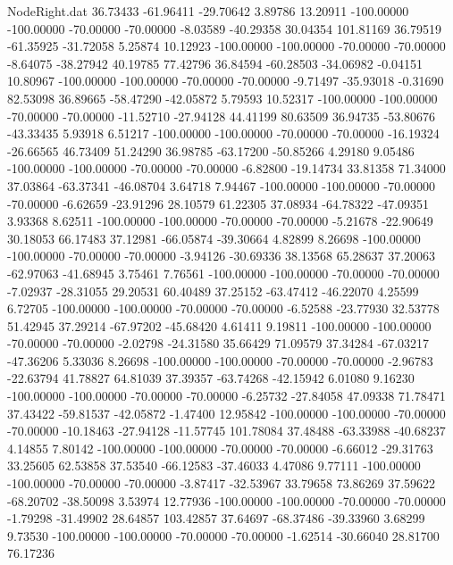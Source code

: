 \begin{filecontents}{NodeRight.dat}
  36.73433  -61.96411  -29.70642     3.89786   13.20911 -100.00000 -100.00000  -70.00000  -70.00000   -8.03589  -40.29358   30.04354  101.81169
  36.79519  -61.35925  -31.72058     5.25874   10.12923 -100.00000 -100.00000  -70.00000  -70.00000   -8.64075  -38.27942   40.19785   77.42796
  36.84594  -60.28503  -34.06982    -0.04151   10.80967 -100.00000 -100.00000  -70.00000  -70.00000   -9.71497  -35.93018   -0.31690   82.53098
  36.89665  -58.47290  -42.05872     5.79593   10.52317 -100.00000 -100.00000  -70.00000  -70.00000  -11.52710  -27.94128   44.41199   80.63509
  36.94735  -53.80676  -43.33435     5.93918    6.51217 -100.00000 -100.00000  -70.00000  -70.00000  -16.19324  -26.66565   46.73409   51.24290
  36.98785  -63.17200  -50.85266     4.29180    9.05486 -100.00000 -100.00000  -70.00000  -70.00000   -6.82800  -19.14734   33.81358   71.34000
  37.03864  -63.37341  -46.08704     3.64718    7.94467 -100.00000 -100.00000  -70.00000  -70.00000   -6.62659  -23.91296   28.10579   61.22305
  37.08934  -64.78322  -47.09351     3.93368    8.62511 -100.00000 -100.00000  -70.00000  -70.00000   -5.21678  -22.90649   30.18053   66.17483
  37.12981  -66.05874  -39.30664     4.82899    8.26698 -100.00000 -100.00000  -70.00000  -70.00000   -3.94126  -30.69336   38.13568   65.28637
  37.20063  -62.97063  -41.68945     3.75461    7.76561 -100.00000 -100.00000  -70.00000  -70.00000   -7.02937  -28.31055   29.20531   60.40489
  37.25152  -63.47412  -46.22070     4.25599    6.72705 -100.00000 -100.00000  -70.00000  -70.00000   -6.52588  -23.77930   32.53778   51.42945
  37.29214  -67.97202  -45.68420     4.61411    9.19811 -100.00000 -100.00000  -70.00000  -70.00000   -2.02798  -24.31580   35.66429   71.09579
  37.34284  -67.03217  -47.36206     5.33036    8.26698 -100.00000 -100.00000  -70.00000  -70.00000   -2.96783  -22.63794   41.78827   64.81039
  37.39357  -63.74268  -42.15942     6.01080    9.16230 -100.00000 -100.00000  -70.00000  -70.00000   -6.25732  -27.84058   47.09338   71.78471
  37.43422  -59.81537  -42.05872    -1.47400   12.95842 -100.00000 -100.00000  -70.00000  -70.00000  -10.18463  -27.94128  -11.57745  101.78084
  37.48488  -63.33988  -40.68237     4.14855    7.80142 -100.00000 -100.00000  -70.00000  -70.00000   -6.66012  -29.31763   33.25605   62.53858
  37.53540  -66.12583  -37.46033     4.47086    9.77111 -100.00000 -100.00000  -70.00000  -70.00000   -3.87417  -32.53967   33.79658   73.86269
  37.59622  -68.20702  -38.50098     3.53974   12.77936 -100.00000 -100.00000  -70.00000  -70.00000   -1.79298  -31.49902   28.64857  103.42857
  37.64697  -68.37486  -39.33960     3.68299    9.73530 -100.00000 -100.00000  -70.00000  -70.00000   -1.62514  -30.66040   28.81700   76.17236

\end{filecontents}
